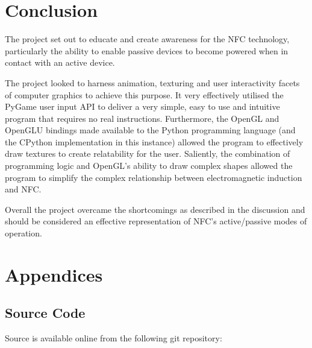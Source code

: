 \documentclass[a4paper]{article}
\begin{document}
\section{Conclusion}
The project set out to educate and create awareness for the NFC technology, particularly the ability to enable passive devices to become powered when in contact with an active device. 

The project looked to harness animation, texturing and user interactivity facets of computer graphics to achieve this purpose. It very effectively utilised the PyGame user input API to deliver a very simple, easy to use and intuitive program that requires no real instructions. Furthermore, the OpenGL and OpenGLU bindings made available to the Python programming language (and the CPython implementation in this instance) allowed the program to effectively draw textures to create relatability for the user. Saliently, the combination of programming logic and OpenGL's ability to draw complex shapes allowed the program to simplify the complex relationship between electromagnetic induction and NFC. 

Overall the project overcame the shortcomings as described in the discussion and should be considered an effective representation of NFC's active/passive modes of operation. 

\section{Appendices}

\subsection{Source Code}
Source is available online from the following git repository: 
\clearpage
\end{document}
